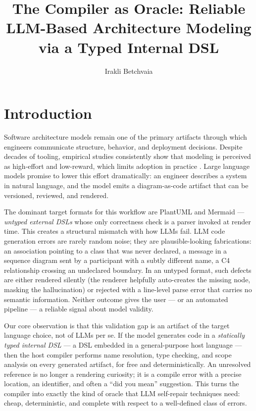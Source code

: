 \documentclass[acmsmall,nonacm]{acmart}
\title{The Compiler as Oracle: Reliable LLM-Based Architecture Modeling via a Typed Internal DSL}
\author{Irakli Betchvaia}
\affiliation{%
  \institution{kUML Project}
  \city{Braunschweig}
  \country{Germany}
}
\begin{document}
\maketitle

\section{Introduction}

Software architecture models remain one of the primary artifacts through which engineers communicate structure, behavior, and deployment decisions. Despite decades of tooling, empirical studies consistently show that modeling is perceived as high-effort and low-reward, which limits adoption in practice \citep{whittle2013}. Large language models promise to lower this effort dramatically: an engineer describes a system in natural language, and the model emits a diagram-as-code artifact that can be versioned, reviewed, and rendered.

The dominant target formats for this workflow are PlantUML and Mermaid --- \emph{untyped external DSLs} whose only correctness check is a parser invoked at render time. This creates a structural mismatch with how LLMs fail. LLM code generation errors are rarely random noise; they are plausible-looking fabrications: an association pointing to a class that was never declared, a message in a sequence diagram sent by a participant with a subtly different name, a C4 relationship crossing an undeclared boundary. In an untyped format, such defects are either rendered silently (the renderer helpfully auto-creates the missing node, masking the hallucination) or rejected with a line-level parse error that carries no semantic information. Neither outcome gives the user --- or an automated pipeline --- a reliable signal about model validity.

Our core observation is that this validation gap is an artifact of the target language choice, not of LLMs per se. If the model generates code in a \emph{statically typed internal DSL} --- a DSL embedded in a general-purpose host language --- then the host compiler performs name resolution, type checking, and scope analysis on every generated artifact, for free and deterministically. An unresolved reference is no longer a rendering curiosity; it is a compile error with a precise location, an identifier, and often a ``did you mean'' suggestion. This turns the compiler into exactly the kind of oracle that LLM self-repair techniques need: cheap, deterministic, and complete with respect to a well-defined class of errors.
\end{document}
